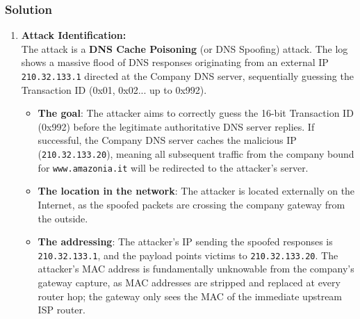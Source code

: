 \documentclass{article}
\begin{document}
\subsubsection*{Solution}
\begin{enumerate}
    \item[\textbf{1.}] \textbf{Attack Identification:} \\
    The attack is a \textbf{DNS Cache Poisoning} (or DNS Spoofing) attack. The log shows a massive flood of DNS responses originating from an external IP \texttt{210.32.133.1} directed at the Company DNS server, sequentially guessing the Transaction ID (0x01, 0x02... up to 0x992).
    \begin{itemize}
        \item \textbf{The goal}: The attacker aims to correctly guess the 16-bit Transaction ID (0x992) before the legitimate authoritative DNS server replies. If successful, the Company DNS server caches the malicious IP (\texttt{210.32.133.20}), meaning all subsequent traffic from the company bound for \texttt{www.amazonia.it} will be redirected to the attacker's server.
        \item \textbf{The location in the network}: The attacker is located externally on the Internet, as the spoofed packets are crossing the company gateway from the outside.
        \item \textbf{The addressing}: The attacker's IP sending the spoofed responses is \texttt{210.32.133.1}, and the payload points victims to \texttt{210.32.133.20}. The attacker's MAC address is fundamentally unknowable from the company's gateway capture, as MAC addresses are stripped and replaced at every router hop; the gateway only sees the MAC of the immediate upstream ISP router.
    \end{itemize}


\end{enumerate}
\end{document}
